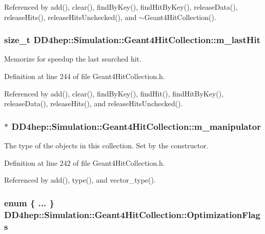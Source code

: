 Referenced by add(), clear(), findByKey(), findHitByKey(), releaseData(), releaseHits(), releaseHitsUnchecked(), and $\sim$Geant4HitCollection().\hypertarget{class_d_d4hep_1_1_simulation_1_1_geant4_hit_collection_a67cef40b22ad50d9c6a5fdd620e1786f}{
\subsubsection[{m\_\-lastHit}]{\setlength{\rightskip}{0pt plus 5cm}size\_\-t {\bf DD4hep::Simulation::Geant4HitCollection::m\_\-lastHit}}}
\label{class_d_d4hep_1_1_simulation_1_1_geant4_hit_collection_a67cef40b22ad50d9c6a5fdd620e1786f}


Memorize for speedup the last searched hit. 

Definition at line 244 of file Geant4HitCollection.h.

Referenced by add(), clear(), findByKey(), findHit(), findHitByKey(), releaseData(), releaseHits(), and releaseHitsUnchecked().\hypertarget{class_d_d4hep_1_1_simulation_1_1_geant4_hit_collection_ab65b438cada304dbfe15f9be6a329001}{
\subsubsection[{m\_\-manipulator}]{$\ast$ {\bf DD4hep::Simulation::Geant4HitCollection::m\_\-manipulator}}}
\label{class_d_d4hep_1_1_simulation_1_1_geant4_hit_collection_ab65b438cada304dbfe15f9be6a329001}


The type of the objects in this collection. Set by the constructor. 

Definition at line 242 of file Geant4HitCollection.h.

Referenced by add(), type(), and vector\_\-type().\hypertarget{class_d_d4hep_1_1_simulation_1_1_geant4_hit_collection_a7f71d7699e398712740081192f4dd846}{
\subsubsection[{OptimizationFlags}]{\setlength{\rightskip}{0pt plus 5cm}enum \{ ... \}   {\bf DD4hep::Simulation::Geant4HitCollection::OptimizationFlags}}}
\label{class_d_d4hep_1_1_simulation_1_1_geant4_hit_collection_a7f71d7699e398712740081192f4dd846}


